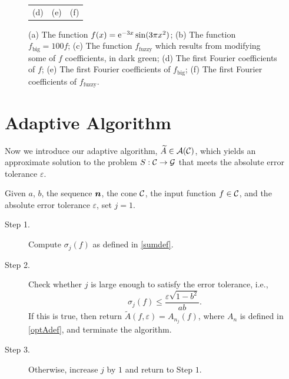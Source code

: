 \documentclass[graybox,footinfo]{svmult}
\begin{document}
\begin{figure}[ht]
\begin{tabular}{c@{\quad}c@{\quad}c}
		\\ (d) & (e) & (f)
	\end{tabular}
	\caption{(a) The function $f(x)={\rm e}^{-3x}\sin(3\pi x^2)$; (b) The function $f_{\text{big}}=100f$; (c) The function $f_{\text{fuzzy}}$ which results from modifying some of $f$ coefficients, in dark green; (d) The first Fourier coefficients of $f$; (e) The first Fourier coefficients of $f_{\text{big}}$; (f) The first Fourier coefficients of $f_{\text{fuzzy}}$. \label{fig:fourier_example}}
\end{figure}

\section{Adaptive Algorithm} \label{sec:adaptalgo}

Now we introduce our adaptive algorithm, $\widetilde{A} \in {\mathcal{A}}({\mathcal{C}})$, which yields an approximate solution to the problem $S:{\mathcal{C}}\rightarrow{\mathcal{G}}$ that meets the absolute error tolerance $\varepsilon$.

\begin{algo}\label{algo2}
Given $a$, $b$, the sequence ${\boldsymbol{n}}$, the cone ${\mathcal{C}}$, the input function $f \in {\mathcal{C}}$, and the absolute error tolerance $\varepsilon$, set $j=1$.
\begin{description}
\item[Step 1.] Compute $\sigma_{j}(f)$ as defined in \eqref{sumdef}.
\item[Step 2.] Check whether $j$ is large enough to satisfy the error tolerance, i.e.,
    \begin{equation*}\label{covcrit}
          \sigma_{j}(f) \le \frac{\varepsilon\sqrt{1 - b^2}}{ab} .
    \end{equation*}
    If this is true, then return $\widetilde{A}(f,\varepsilon) = A_{n_{j}}(f)$, where $A_n$ is defined in \eqref{optAdef}, and terminate the algorithm.
\item[Step 3.] Otherwise, increase $j$ by $1$ and return to Step $1$.
\end{description}
\end{algo}
\end{document}
